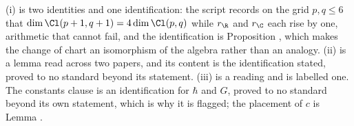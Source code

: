 (i) is two identities and one identification: the script records on the grid $p, q \leq 6$ that $\dim \Cl(p+1,q+1) = 4\dim\Cl(p,q)$ while $r_{\R}$ and $r_{\C}$ each rise by one, arithmetic that cannot fail, and the identification is Proposition , which makes the change of chart an isomorphism of the algebra rather than an analogy. (ii) is a lemma read across two papers, and its content is the identification stated, proved to no standard beyond its statement. (iii) is a reading and is labelled one. The constants clause is an identification for $\hbar$ and $G$, proved to no standard beyond its own statement, which is why it is flagged; the placement of $c$ is Lemma .

